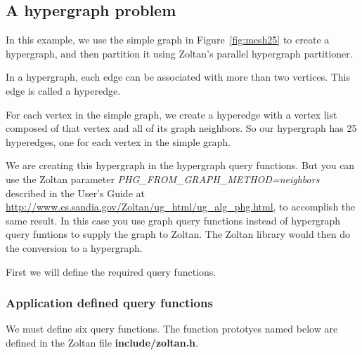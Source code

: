 \clearpage
\subsection{A hypergraph problem}

In this example, we use the simple graph in  Figure~\ref{fig:mesh25}
to create a hypergraph, and
then partition it using Zoltan's parallel hypergraph
partitioner.  

In a hypergraph, each edge can be associated with more than
two vertices.  This edge is called a hyperedge.

For each vertex in the simple graph, we create a hyperedge
with a vertex list composed of that vertex and all of its
graph neighbors.  So our hypergraph has 25 hyperedges, one
for each vertex in the simple graph.

We are creating this hypergraph in the hypergraph query functions.
But you can use the Zoltan parameter
\emph{PHG\_FROM\_GRAPH\_METHOD=neighbors} 
described in the User's Guide at 
\url{http://www.cs.sandia.gov/Zoltan/ug_html/ug_alg_phg.html},
to accomplish the same
result.  In this case you use graph query functions instead of
hypergraph query funtions to supply the 
graph to Zoltan.
The Zoltan library would then do the conversion to a hypergraph.

First we will define the required query functions.

\subsubsection{Application defined query functions}

We must define six query functions.  The function prototyes named 
below are defined in the Zoltan file \textbf{include/zoltan.h}.

